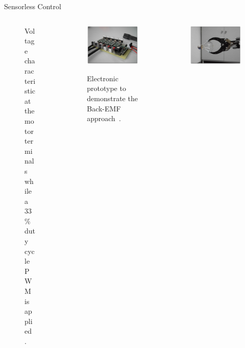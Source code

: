 \begin{frame}{Sensorless Control}
\begin{columns}[t]
\begin{column}{0.34\textwidth}
\begin{figure}
\vspace{-1em}
\caption{\scriptsize Voltage characteristic at the motor terminals while a 
33\%~duty cycle PWM is applied~\cite{kerdels2008b}.}
\end{figure}
\end{column}
\begin{column}{0.28\textwidth}
\begin{figure}
{
\hspace{-0.5em}
\includegraphics[width=0.98\linewidth]{sensorless/controller.jpg}
}

\vspace{-0.75em}
\caption{\scriptsize Electronic prototype to demonstrate the Back-EMF 
approach~\cite{kerdels2008b}.}
\end{figure}
\end{column}
\begin{column}{0.28\textwidth}
\begin{figure}
{
\hspace{-0.5em}
\includegraphics[width=0.98\linewidth]{sensorless/bulb.jpg}
}


\end{figure}
\end{column}
\end{columns}
\end{frame}
